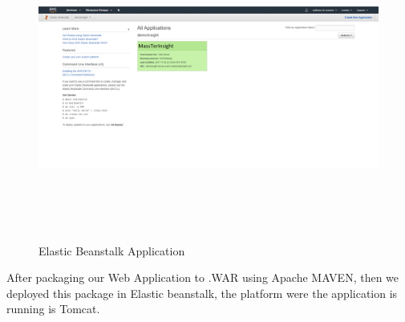 	\begin{figure}[h]
		\centering
		\includegraphics[width=17cm,height=10cm]{ElasticBeanstalkApplication.png}
		\caption{Elastic Beanstalk Application}	
	\end{figure}

After packaging our Web Application to .WAR using Apache MAVEN, then we deployed this package in Elastic beanstalk, the platform were the application is running is Tomcat.

